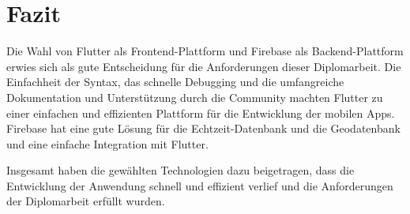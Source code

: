 \section{Fazit}

Die Wahl von Flutter als Frontend-Plattform und Firebase als Backend-Plattform erwies sich als gute Entscheidung für die Anforderungen dieser Diplomarbeit. Die Einfachheit der Syntax, das schnelle Debugging und die umfangreiche Dokumentation und Unterstützung durch die Community machten Flutter zu einer einfachen und effizienten Plattform für die Entwicklung der mobilen Apps. Firebase hat eine gute Lösung für die Echtzeit-Datenbank und die Geodatenbank und eine einfache Integration mit Flutter.

Insgesamt haben die gewählten Technologien dazu beigetragen, dass die Entwicklung der Anwendung schnell und effizient verlief und die Anforderungen der Diplomarbeit erfüllt wurden.

